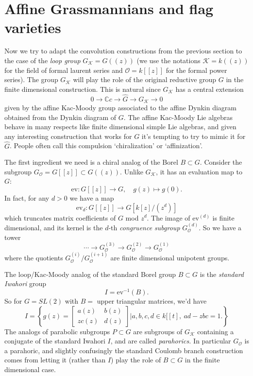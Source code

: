 \documentclass[11pt]{amsart}
\theoremstyle{definition}
\newcommand{\Kc}{\mathcal{K}}
\newcommand{\Oc}{\mathcal{O}}
\newcommand{\ev}{{\mathrm{ev}}}
\numberwithin{equation}{subsection}
\numberwithin{figure}{subsection}
\begin{document}
\section{Affine Grassmannians and flag varieties}
Now we try to adapt the convolution constructions from the previous section to the case of the \emph{loop group} $G_\Kc=G((z))$ (we use the notations $\Kc=k((z))$ for the field of formal laurent series and $\Oc = k[[z]]$ for the formal power series).  The group $G_\Kc$ will play the role of the original reductive group $G$ in the finite dimensional construction. This is natural since $G_\Kc$ has a central extension 
$$
0\rightarrow \mathbb{C}c\rightarrow \widehat{G}\rightarrow G_\Kc\rightarrow0
$$ given by the affine Kac-Moody group associated to the affine Dynkin diagram obtained from the Dynkin diagram of $G$. The affine Kac-Moody Lie algebras behave in many respects like finite dimensional simple Lie algebras, and given any interesting construction that works for $G$ it's tempting to try to mimic it for $\widehat{G}$. People often call this compulsion `chiralization' or `affinization'.



The first ingredient we need is a chiral analog of the Borel $B\subset G$. Consider the subgroup $G_\Oc = G[[z]]\subset G((z))$. Unlike $G_\Kc$, it has an evaluation map  to $G$:
$$
\mathrm{ev}\colon G[[z]]\rightarrow G, \quad g(z)\mapsto g(0).
$$ 
In fact, for any $d>0$ we have a map
$$
\mathrm{ev}_d\colon G[[z]]\rightarrow G[k[z]/(z^d)]
$$
which truncates matrix coefficients of $G$ mod $z^d$. The  image of $\ev^{(d)}$ is finite dimensional, and its kernel is the $d$-th \emph{congruence subgroup} $G_\Oc^{(d)}$.
So we have a tower
$$
\cdots\rightarrow G_\Oc^{(3)}\rightarrow G_\Oc^{(2)}\rightarrow G_\Oc^{(1)}
$$
where the quotients $G_\Oc^{(i)}/G_\Oc^{(i+1)}$ are finite dimensional unipotent groups.

The loop/Kac-Moody analog of the standard Borel group $B\subset G$ is the \emph{standard Iwahori } group
$$
I = \mathrm{ev}^{-1}(B).
$$
So for $G=SL(2)$ with $B = $ upper triangular matrices, we'd have
$$
I = \left\{g(z)=\begin{bmatrix} a(z)&b(z)\\ zc(z)&d(z)\end{bmatrix} \bigg | a,b,c,d\in k[[t],~ ad-zbc=1.\right\}
$$
The analogs of parabolic subgroups $P\subset G$ are subgroups of $G_\Kc$ containing a conjugate of the standard Iwahori $I$, and are called \emph{parahorics.} In particular $G_\Oc$ is a parahoric, and slightly confusingly the standard Coulomb branch construction comes from letting it (rather than $I$) play the role of $B\subset G$ in the finite dimensional case.
\end{document}

